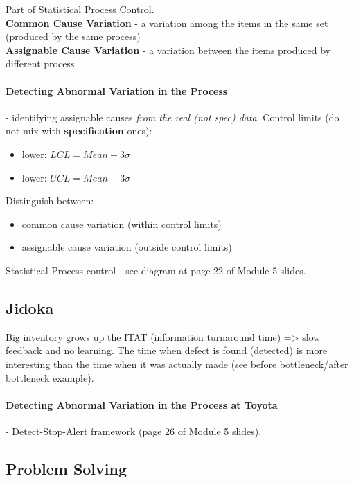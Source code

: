 \documentclass{scrartcl}
\begin{document}
Part of Statistical Process Control.\\

{\bf Common Cause Variation } - a variation among the items in the same set (produced by the same process)\\
{\bf Assignable Cause Variation} - a variation between the items produced by different process.\\

\paragraph{Detecting Abnormal Variation in the Process}

- identifying assignable causes {\em from the real (not spec) data}. Control limits (do not mix with {\bf specification} ones):
\begin{itemize}
\item lower: $LCL = Mean - 3 \sigma$
\item lower: $UCL = Mean + 3 \sigma$
\end{itemize}
Distinguish between:
\begin{itemize}
\item common cause variation (within control limits)
\item assignable cause variation (outside control limits)
\end{itemize}
Statistical Process control - see diagram at page 22 of Module 5 slides.

\subsection{Jidoka}
\label{sec:07-05}

Big inventory grows up the ITAT (information turnaround time) => slow feedback and no learning. The time when defect is found (detected) is more interesting than the time when it was actually made (see before bottleneck/after bottleneck example).

\paragraph{Detecting Abnormal Variation in the Process at Toyota}

- Detect-Stop-Alert framework (page 26 of Module 5 slides).

\subsection{Problem Solving}
\label{sec:07-06}
\end{document}
